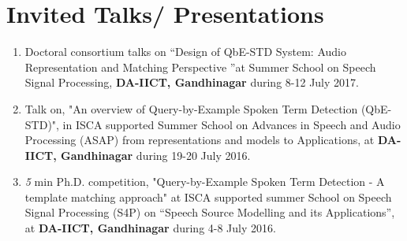 \documentclass[10pt]{article}
\begin{document}
\section*{Invited Talks/ Presentations}
\begin{enumerate}
			\setlength\itemsep{0.15em}
\item Doctoral consortium talks on ``Design of QbE-STD System: Audio Representation and Matching Perspective ''at Summer School on Speech Signal Processing, \textbf{DA-IICT, Gandhinagar} during 8-12 July 2017.
\item Talk on, "An overview of Query-by-Example Spoken Term Detection (QbE-STD)", in ISCA supported Summer School on Advances in Speech and Audio Processing (ASAP) from representations and models to Applications, at \textbf{DA-IICT, Gandhinagar} during 19-20 July 2016.
\item \textit{5} min Ph.D. competition, "Query-by-Example Spoken Term Detection - A template matching approach" at ISCA supported summer School on Speech Signal Processing (S4P) on ``Speech Source Modelling and its Applications'', at \textbf{DA-IICT, Gandhinagar} during 4-8 July 2016.   
\end{enumerate}
\end{document}
